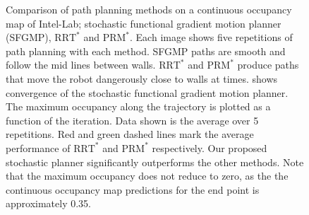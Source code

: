 \documentclass[letterpaper, 10 pt, conference]{ieeeconf}  %
\begin{document}
\begin{figure}[!ht]
	\centering
 	
 	\hspace{1pt}
     	\vfill
    \hspace{1pt}
 	\caption{Comparison of path planning methods on a continuous occupancy map of Intel-Lab; \protect{} stochastic functional gradient motion planner (SFGMP), \protect{} $\text{RRT}^*$ and \protect{} $\text{PRM}^*$. Each image shows five repetitions of path planning with each method. SFGMP paths are smooth and follow the mid lines between walls. $\text{RRT}^*$ and $\text{PRM}^*$ produce paths that move the robot dangerously close to walls at times. \protect{} shows convergence of the stochastic functional gradient motion planner. The maximum occupancy along the trajectory is plotted as a function of the iteration. Data shown is the average over 5 repetitions. Red and green dashed lines mark the average performance of $\text{RRT}^*$ and $\text{PRM}^*$ respectively. Our proposed stochastic planner significantly outperforms the other methods. Note that the maximum occupancy does not reduce to zero, as the the continuous occupancy map predictions for the end point is approximately 0.35.}
 	\label{fig:Intel_Comparison}
 \end{figure}
\end{document}
